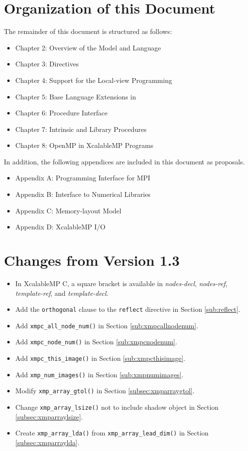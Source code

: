 \section{Organization of this Document}

The remainder of this document is structured as follows:

\begin{itemize}
 \item Chapter 2: Overview of the {\XMP} Model and Language
 \item Chapter 3: Directives 
 \item Chapter 4: Support for the Local-view Programming
 \item Chapter 5: Base Language Extensions in {\XMPC}
 \item Chapter 6: Procedure Interface
 \item Chapter 7: Intrinsic and Library Procedures
 \item Chapter 8: OpenMP in XcalableMP Programs
\end{itemize}
%
In addition, the following appendices are included in this document as
proposals.
%
\begin{itemize}
 \item Appendix A: Programming Interface for MPI
 \item Appendix B: Interface to Numerical Libraries
 \item Appendix C: Memory-layout Model
 \item Appendix D: XcalableMP I/O
\end{itemize}

\section{Changes from Version 1.3}
\begin{itemize}
  \item In XcalableMP C, a square bracket is available in {\it nodes-decl}, {\it nodes-ref}, 
  {\it template-ref}, and {\it template-decl}.
  \item Add the {\tt orthogonal} clause to the {\tt reflect} directive in Section \ref{sub:reflect}.
  \item Add {\tt xmpc\_all\_node\_num()} in Section \ref{sub:xmpcallnodenum}.
  \item Add {\tt xmpc\_node\_num()} in Section \ref{sub:xmpcnodenum}.
  \item Add {\tt xmpc\_this\_image()} in Section \ref{sub:xmpcthisimage}.
  \item Add {\tt xmp\_num\_images()} in Section \ref{sub:xmpnumimages}.
  \item Modify {\tt xmp\_array\_gtol()} in Section \ref{subsec:xmparraygtol}.
  \item Change {\tt xmp\_array\_lsize()} not to include shadow object in Section \ref{subsec:xmparraylsize}.
  \item Create {\tt xmp\_array\_lda()} from {\tt xmp\_array\_lead\_dim()} in Section \ref{subsec:xmparraylda}.
\end{itemize}

